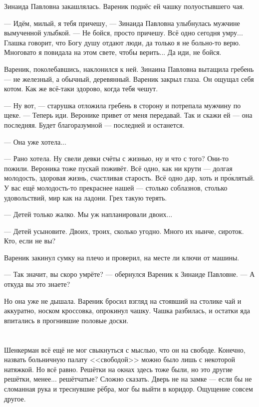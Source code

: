 Зинаида Павловна закашлялась.
Вареник поднёс ей чашку полуостывшего чая.

--- Идём, милый, я тебя причешу, --- Зинаида Павловна улыбнулась мужчине вымученной улыбкой.
--- Не бойся, просто причешу.
Всё одно сегодня умру...
Глашка говорит, что Богу душу отдают люди, да только я не больно-то верю.
Многовато я повидала на этом свете, чтобы верить...
Да иди, не бойся.

Вареник, поколебавшись, наклонился к ней.
Зинаина Павловна вытащила гребень --- не железный, а обычный, деревянный.
Вареник закрыл глаза.
Он ощущал себя котом.
Как же всё-таки здорово, когда тебя чешут.

--- Ну вот, --- старушка отложила гребень в сторону и потрепала мужчину по щеке.
--- Теперь иди.
Веронике привет от меня передавай.
Так и скажи ей --- она последняя.
Будет благоразумной --- последней и останется.

--- Она уже хотела...

--- Рано хотела.
Ну свели девки счёты с жизнью, ну и что с того?
Они-то пожили.
Вероника тоже пускай поживёт.
Всё одно, как ни крути --- долгая молодость, здоровая жизнь, счастливая старость.
Всё одно дар, хоть и пр\'оклятый.
У вас ещё молодость-то прекраснее нашей --- столько соблазнов, столько удовольствий, мир как на ладони.
Грех такую терять.

--- Детей только жалко.
Мы уж напланировали двоих...

--- Детей усыновите.
Двоих, троих, сколько угодно.
Много их нынче, сироток.
Кто, если не вы?

Вареник закинул сумку на плечо и проверил, на месте ли ключи от машины.

--- Так значит, вы скоро умрёте? --- обернулся Вареник к Зинаиде Павловне.
--- А откуда вы это знаете?

Но она уже не дышала.
Вареник бросил взгляд на стоявший на столике чай и аккуратно, носком кроссовка, опрокинул чашку.
Чашка разбилась, и остатки яда впитались в прогнившие половые доски.

\chapter{}

\textspace

Шенкерман всё ещё не мог свыкнуться с мыслью, что он на свободе.
Конечно, назвать больничную палату <<свободой>> можно было лишь с некоторой натяжкой.
Но всё равно.
Решётки на окнах здесь тоже были, но это другие решётки, менее... решётчатые?
Сложно сказать.
Дверь не на замке --- если бы не сломанная рука и треснувшие рёбра, мог бы выйти в коридор.
Ощущение совсем другое.

